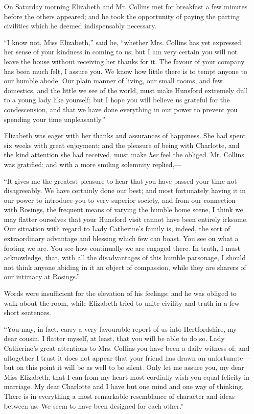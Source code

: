On Saturday morning Elizabeth and Mr. Collins met for breakfast a few minutes before the others appeared; and he took the opportunity of paying the parting civilities which he deemed indispensably necessary.

``I know not, Miss Elizabeth,'' said he, ``whether Mrs. Collins has yet expressed her sense of your kindness in coming to us; but I am very certain you will not leave the house without receiving her thanks for it. The favour of your company has been much felt, I assure you. We know how little there is to tempt anyone to our humble abode. Our plain manner of living, our small rooms, and few domestics, and the little we see of the world, must make Hunsford extremely dull to a young lady like yourself; but I hope you will believe us grateful for the condescension, and that we have done everything in our power to prevent you spending your time unpleasantly.''

Elizabeth was eager with her thanks and assurances of happiness. She had spent six weeks with great enjoyment; and the pleasure of being with Charlotte, and the kind attention she had received, must make \textit{her} feel the obliged. Mr. Collins was gratified; and with a more smiling solemnity replied,---

``It gives me the greatest pleasure to hear that you have passed your time not disagreeably. We have certainly done our best; and most fortunately having it in our power to introduce you to very superior society, and from our connection with Rosings, the frequent means of varying the humble home scene, I think we may flatter ourselves that your Hunsford visit cannot have been entirely irksome. Our situation with regard to Lady Catherine's family is, indeed, the sort of extraordinary advantage and blessing which few can boast. You see on what a footing we are. You see how continually we are engaged there. In truth, I must acknowledge, that, with all the disadvantages of this humble parsonage, I should not think anyone abiding in it an object of compassion, while they are sharers of our intimacy at Rosings.''

Words were insufficient for the elevation of his feelings; and he was obliged to walk about the room, while Elizabeth tried to unite civility and truth in a few short sentences.

``You may, in fact, carry a very favourable report of us into Hertfordshire, my dear cousin. I flatter myself, at least, that you will be able to do so. Lady Catherine's great attentions to Mrs. Collins you have been a daily witness of; and altogether I trust it does not appear that your friend has drawn an unfortunate---but on this point it will be as well to be silent. Only let me assure you, my dear Miss Elizabeth, that I can from my heart most cordially wish you equal felicity in marriage. My dear Charlotte and I have but one mind and one way of thinking. There is in everything a most remarkable resemblance of character and ideas between us. We seem to have been designed for each other.''

